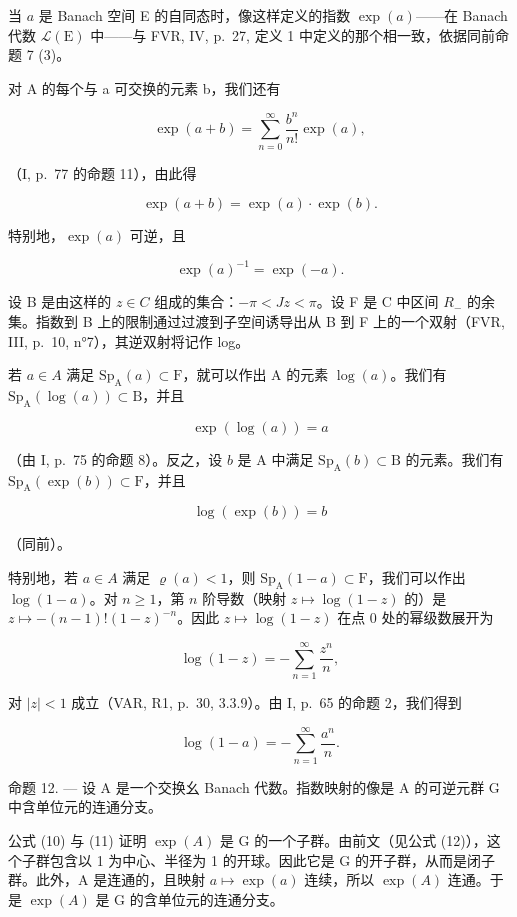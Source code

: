 当 \(a\) 是 Banach 空间 E 的自同态时，像这样定义的指数 \(\exp(a)\)——在 Banach 代数 \(\mathcal{L}(\mathrm{E})\) 中——与 FVR, IV, p.~27, 定义 1 中定义的那个相一致，依据同前命题 7 (3)。

对 A 的每个与 a 可交换的元素 b，我们还有

\[
\exp (a + b) = \sum_ {n = 0} ^ {\infty} \frac {b ^ {n}}{n !} \exp (a),
\]

（I, p.~77 的命题 11），由此得

\[
\exp (a + b) = \exp (a) \cdot \exp (b).\tag{10}
\]

特别地，\(\exp(a)\) 可逆，且

\[
\exp (a) ^ {- 1} = \exp (- a).\tag{11}
\]

设 B 是由这样的 \(z \in C\) 组成的集合：\(-\pi < Jz < \pi\)。设 F 是 C 中区间 \(R_{-}\) 的余集。指数到 B 上的限制通过过渡到子空间诱导出从 B 到 F 上的一个双射（FVR, III, p.~10, n°7），其逆双射将记作 log。

若 \(a \in A\) 满足 \(\mathrm{Sp}_{\mathrm{A}}(a) \subset \mathrm{F}\)，就可以作出 A 的元素 \(\log(a)\)。我们有 \(\mathrm{Sp}_{\mathrm{A}}(\log(a)) \subset \mathrm{B}\)，并且

\[
\exp (\log (a)) = a\tag{12}
\]

（由 I, p.~75 的命题 8）。反之，设 \(b\) 是 A 中满足 \(\mathrm{Sp}_{\mathrm{A}}(b) \subset \mathrm{B}\) 的元素。我们有 \(\mathrm{Sp}_{\mathrm{A}}(\exp(b)) \subset \mathrm{F}\)，并且

\[
\log (\exp (b)) = b\tag{13}
\]

（同前）。

特别地，若 \(a \in A\) 满足 \(\varrho(a) < 1\)，则 \(\mathrm{Sp}_{\mathrm{A}}(1 - a) \subset \mathrm{F}\)，我们可以作出 \(\log(1 - a)\)。对 \(n \geqslant 1\)，第 \(n\) 阶导数（映射 \(z \mapsto \log(1 - z)\) 的）是 \(z \mapsto -(n - 1)! (1 - z)^{-n}\)。因此 \(z \mapsto \log(1 - z)\) 在点 0 处的幂级数展开为

\[
\log (1 - z) = - \sum_ {n = 1} ^ {\infty} \frac {z ^ {n}}{n},
\]

对 \(|z| < 1\) 成立（VAR, R1, p.~30, 3.3.9）。由 I, p.~65 的命题 2，我们得到

\[
\log (1 - a) = - \sum_ {n = 1} ^ {\infty} \frac {a ^ {n}}{n}.\tag{14}
\]

命题 12. --- 设 A 是一个交换幺 Banach 代数。指数映射的像是 A 的可逆元群 G 中含单位元的连通分支。

公式 (10) 与 (11) 证明 \(\exp(A)\) 是 G 的一个子群。由前文（见公式 (12)），这个子群包含以 1 为中心、半径为 1 的开球。因此它是 G 的开子群，从而是闭子群。此外，A 是连通的，且映射 \(a \mapsto \exp(a)\) 连续，所以 \(\exp(A)\) 连通。于是 \(\exp(A)\) 是 G 的含单位元的连通分支。

